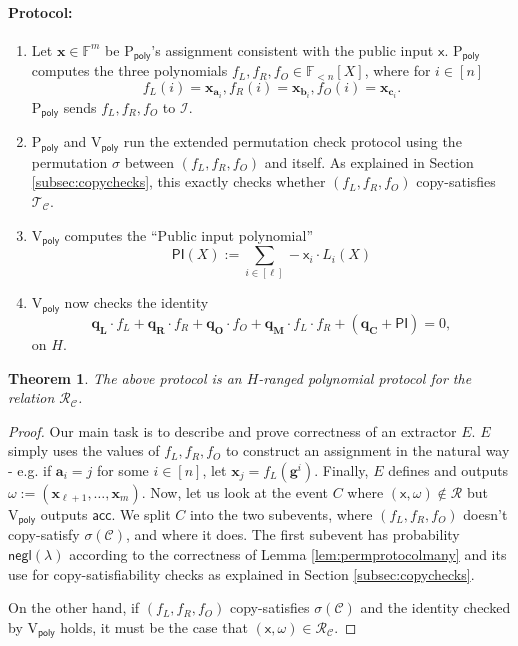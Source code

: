 \documentclass[11pt]{article} %
\newcommand{\F}{\ensuremath{\mathbb F}\xspace}
\newcommand{\sigof}[1]{\ensuremath{\sigma(#1)}\xspace}
\newcommand{\negl}{\ensuremath{\mathsf{negl}(\lambda)}\xspace}
\newcommand{\acc}{\ensuremath{\mathsf{acc}}\xspace}
\newcommand{\defeq}{:=}
\newcommand{\dom}{\ensuremath{H}\xspace}
\newcommand{\partition}{\ensuremath{{\mathcal T}}\xspace}
\newcommand{\partof}[1]{\ensuremath{{\partition_{#1}}}\xspace}
\newcommand{\prvpoly}{\ensuremath{\mathrm{P_{\mathsf{poly}}}}\xspace}
\newcommand{\verpoly}{\ensuremath{\mathrm{V_{\mathsf{poly}}}}\xspace}
\newcommand{\ideal}{\ensuremath{\mathcal{I}}\xspace}
\newcommand{\inp}{\ensuremath{\mathsf{x}}\xspace}
\newcommand{\wit}{\ensuremath{\omega}\xspace}
\newcommand{\rel}{\ensuremath{\mathcal{R}}\xspace}
\newcommand{\ext}{\ensuremath{E}\xspace}
\newcommand{\hgen}{\ensuremath{\mathbf{g}}\xspace}
\newcommand{\polysofdeg}[1]{\ensuremath{\F_{< #1}[X]}\xspace}
\newcommand{\PI}{\ensuremath{\mathsf{PI}}\xspace}
\newcommand{\selleft}{\ensuremath{\mathbf{q_L}}\xspace}
\newcommand{\selright}{\ensuremath{\mathbf{q_R}}\xspace}
\newcommand{\selout}{\ensuremath{\mathbf{q_O}}\xspace}
\newcommand{\selmult}{\ensuremath{\mathbf{q_M}}\xspace}
\newcommand{\selconst}{\ensuremath{\mathbf{q_C}}\xspace}
\newcommand{\lvar}{\ensuremath{\mathbf{a}}\xspace}
\newcommand{\rvar}{\ensuremath{\mathbf{b}}\xspace}
\newcommand{\ovar}{\ensuremath{\mathbf{c}}\xspace}
\newcommand{\assignment}{\ensuremath{\mathbf{x}}\xspace}
\newcommand{\constsystem}{\ensuremath{\mathscr{C}}\xspace}
\newcommand{\relof}[1]{\ensuremath{\rel_{#1}}\xspace}
\newcommand{\pubinppoly}{\ensuremath{\mathsf{PI}}\xspace}
\newtheorem{thm}[lemma]{Theorem}
\begin{document}
\paragraph{Protocol:}

\begin{enumerate}
 \item Let $\assignment\in \F^m$ be \prvpoly's assignment consistent with the public input \inp.
 \prvpoly computes the three polynomials $f_L,f_R,f_O\in \polysofdeg{n}$, where for $i\in [n]$
\[f_L(i)= \assignment_{\lvar_i},f_R(i)= \assignment_{\rvar_i},f_O(i)= \assignment_{\ovar_i}.\]
\prvpoly sends $f_L,f_R,f_O$ to \ideal.
\item \prvpoly and \verpoly run the extended permutation check protocol using the permutation $\sigma$ between $(f_L,f_R,f_O)$ and itself. As explained in Section \ref{subsec:copychecks}, this exactly checks whether $(f_L,f_R,f_O)$ copy-satisfies \partof{\constsystem}.
\item \verpoly computes the ``Public input polynomial'' 
\[\pubinppoly(X) \defeq \sum_{i\in [\ell]} -\inp_i \cdot L_i(X) \]
\item \verpoly now checks the identity 
\[\selleft \cdot f_L + \selright \cdot f_R + \selout \cdot f_O + \selmult\cdot f_L\cdot f_R+ (\selconst+\PI) =0,\]
on \dom.

\end{enumerate}

\begin{thm}\label{thm:mainprot}
 The above protocol is an  \dom-ranged polynomial protocol for the relation \relof{\constsystem}.
\end{thm}
\begin{proof}
 Our main task is to describe and prove correctness of an extractor \ext.
 \ext simply uses the values of $f_L,f_R,f_O$ to construct an assignment in the natural way - e.g. if $\lvar_i = j$ for some $i\in [n]$, let $\assignment_j = f_L(\hgen^i)$.
 Finally, \ext defines and outputs $\wit \defeq (\assignment_{\ell+1},\ldots,\assignment_m)$.
 Now, let us look at the event  $C$ where $(\inp,\wit)\notin \rel$ but \verpoly outputs \acc.
We split $C$ into the two subevents, where $(f_L,f_R,f_O)$ doesn't copy-satisfy \sigof{\constsystem},
and where it does.
The first subevent has probability \negl according to the correctness of Lemma \ref{lem:permprotocolmany} and its use for copy-satisfiability checks as explained in Section \ref{subsec:copychecks}.

On the other hand, if $(f_L,f_R,f_O)$ copy-satisfies \sigof{\constsystem} and the identity checked by \verpoly holds, it must be the case that $(\inp,\wit)\in \relof{\constsystem}$.
 \end{proof}
\end{document}

